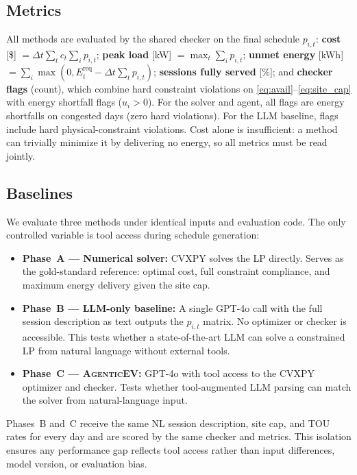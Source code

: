 \documentclass{article}
\newcommand{\modelname}{\textsc{AgenticEV}}
\begin{document}
\subsection{Metrics}

All methods are evaluated by the shared checker on the final schedule $p_{i,t}$: \textbf{cost} [\$] $= \Delta t\sum_t c_t \sum_i p_{i,t}$; \textbf{peak load} [kW] $= \max_t \sum_i p_{i,t}$; \textbf{unmet energy} [kWh] $= \sum_i\max(0, E_i^{\text{req}}-\Delta t\sum_t p_{i,t})$; \textbf{sessions fully served} [\%]; and \textbf{checker flags} (count), which combine hard constraint violations on \eqref{eq:avail}--\eqref{eq:site_cap} with energy shortfall flags ($u_i > 0$). For the solver and agent, all flags are energy shortfalls on congested days (zero hard violations). For the LLM baseline, flags include hard physical-constraint violations. Cost alone is insufficient: a method can trivially minimize it by delivering no energy, so all metrics must be read jointly.

\subsection{Baselines}

We evaluate three methods under identical inputs and evaluation code. The only controlled variable is tool access during schedule generation:
\begin{itemize}
  \item \textbf{Phase~A — Numerical solver:} CVXPY solves the LP directly. Serves as the gold-standard reference: optimal cost, full constraint compliance, and maximum energy delivery given the site cap.
  \item \textbf{Phase~B — LLM-only baseline:} A single GPT-4o call with the full session description as text outputs the $p_{i,t}$ matrix. No optimizer or checker is accessible. This tests whether a state-of-the-art LLM can solve a constrained LP from natural language without external tools.
  \item \textbf{Phase~C — \modelname{}:} GPT-4o with tool access to the CVXPY optimizer and checker. Tests whether tool-augmented LLM parsing can match the solver from natural-language input.
\end{itemize}
Phases~B and~C receive the same NL session description, site cap, and TOU rates for every day and are scored by the same checker and metrics. This isolation ensures any performance gap reflects tool access rather than input differences, model version, or evaluation bias.
\end{document}
